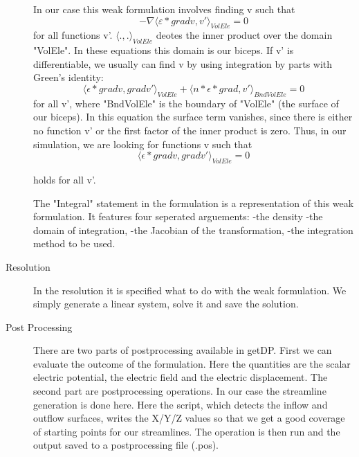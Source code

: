 \documentclass[preprint,journal]{vgtc}       %
\begin{document}
\begin{description}
	In our case this weak formulation involves finding v such that
	\[-\nabla \langle \varepsilon *\mathrel{grad} v, v' \rangle _{VolEle}= 0\]
	for all functions v'. $\langle .,. \rangle _{VolEle}$ deotes the inner product over the domain "VolEle". 
	In these equations this domain is our biceps. 
	If v' is differentiable, we usually can find v by using integration by parts with Green's identity:
	\[\langle \epsilon * \mathrel{grad} v, \mathrel{grad} v' \rangle _{VolEle} + \langle n * \epsilon * \mathrel{grad} , v' \rangle _{BndVolEle} =  0\]
	for all v', where "BndVolEle" is the boundary of "VolEle" (the surface of our biceps). 
	In this equation the surface term vanishes, since there is either no function v' or the first factor of the inner product is zero.
	Thus, in our simulation, we are looking for functions v such that 
	\[
	\langle {\epsilon * \mathrel{grad} {v}, \mathrel{grad} v'} \rangle _{VolEle} =  0
	\]
	
	holds for all v'.
	
	The "Integral" statement in the formulation is a representation of this weak formulation. 
	It features four seperated arguements:
	-the density\newline
	-the domain of integration, \newline
	-the Jacobian of the transformation, \newline
	-the integration method to be used.
	
	\item[Resolution]
	In the resolution it is specified what to do with the weak formulation. 
	We simply generate a linear system, solve it and save the solution.  %
	\item[Post Processing]
	There are two parts of postprocessing available in getDP. 
	First we can evaluate the outcome of the formulation. 
	Here the quantities are the scalar electric potential, the electric field and the electric displacement.
	The second part are postprocessing operations. 
	In our case the streamline generation is done here. 
	Here the script, which detects the inflow and outflow surfaces, writes the X/Y/Z values so that we get a good coverage of starting points for our streamlines. 
	The operation is then run and the output saved to a postprocessing file (.pos).
	\end{description}
\end{document}
